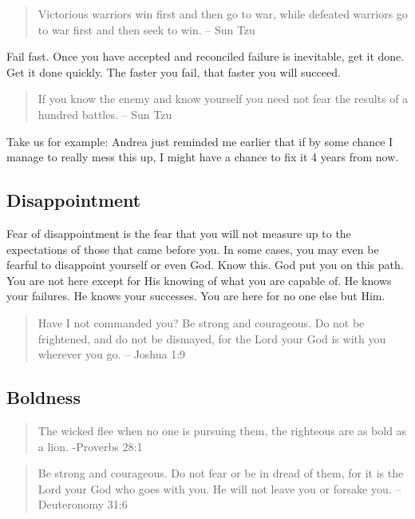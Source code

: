 \documentclass[11pt,a4paper,sans]{article}
\begin{document}
\begin{quote}
    Victorious warriors win first and then go to war, while defeated warriors go to war first and then seek to win. – Sun Tzu
\end{quote}

Fail fast. Once you have accepted and reconciled failure is inevitable, get it done. Get it done quickly. The faster you fail, that faster you will succeed. 


\begin{quote}
    If you know the enemy and know yourself you need not fear the results of a hundred battles. – Sun Tzu
\end{quote}

Take us for example: Andrea just reminded me earlier that if by some chance I manage to really mess this up, I might have a chance to fix it 4 years from now. 

\subsection{Disappointment}

Fear of disappointment is the fear that you will not measure up to the expectations of those that came before you. In some cases, you may even be fearful to disappoint yourself or even God. Know this. God put you on this path. You are not here except for His knowing of what you are capable of. He knows your failures. He knows your successes. You are here for no one else but Him.

\begin{quote}
     Have I not commanded you? Be strong and courageous. Do not be frightened, and do not be dismayed, for the Lord your God is with you wherever you go. -- Joshua 1:9
\end{quote}

\subsection{Boldness}

\begin{quote}
    The wicked flee when no one is pursuing them, the righteous are as bold as a lion. -Proverbs 28:1
\end{quote}

\begin{quote}
    Be strong and courageous. Do not fear or be in dread of them, for it is the Lord your God who goes with you. He will not leave you or forsake you. -- Deuteronomy 31:6
\end{quote}
\end{document}
